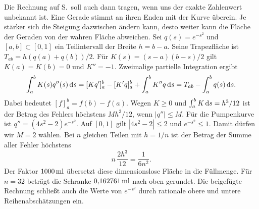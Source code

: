 Die Rechnung auf S.\, soll auch dann tragen, wenn uns der exakte Zahlenwert unbekannt ist. Eine Gerade stimmt an ihren Enden mit der Kurve überein. Je stärker sich die Steigung dazwischen ändern kann, desto weiter kann die Fläche der Geraden von der wahren Fläche abweichen.
Sei \(q(s)=e^{-s^2}\) und \([a,b]\subset[0,1]\) ein Teilintervall der Breite \(h=b-a\). Seine Trapezfläche ist \(T_{ab}=h(q(a)+q(b))/2\). Für \(K(s)=(s-a)(b-s)/2\) gilt \(K(a)=K(b)=0\) und \(K''=-1\). Zweimalige partielle Integration ergibt
\[
 \int_a^b K(s)q''(s)\,\mathrm{d} s
 =[Kq']_a^b-[K'q]_a^b+\int_a^b K''q\,\mathrm{d} s
 =T_{ab}-\int_a^b q(s)\,\mathrm{d} s .
\]
Dabei bedeutet \([f]_a^b=f(b)-f(a)\). Wegen \(K\ge0\) und \(\int_a^b K\,\mathrm{d} s=h^3/12\) ist der Betrag des Fehlers höchstens \(Mh^3/12\), wenn \(|q''|\le M\).
Für die Pumpenkurve ist \(q''=(4s^2-2)e^{-s^2}\). Auf \([0,1]\) gilt \(|4s^2-2|\le2\) und \(e^{-s^2}\le1\). Damit dürfen wir \(M=2\) wählen. Bei \(n\) gleichen Teilen mit \(h=1/n\) ist der Betrag der Summe aller Fehler höchstens
\[
 n\,\frac{2h^3}{12}=\frac{1}{6n^2}.
\]
Der Faktor \(1000\,\mathrm{ml}\) übersetzt diese dimensionslose Fläche in die Füllmenge. Für \(n=32\) beträgt die Schranke \(0{,}162761\,\mathrm{ml}\) nach oben gerundet. Die beigefügte Rechnung schließt auch die Werte von \(e^{-s^2}\) durch rationale obere und untere Reihenabschätzungen ein.

